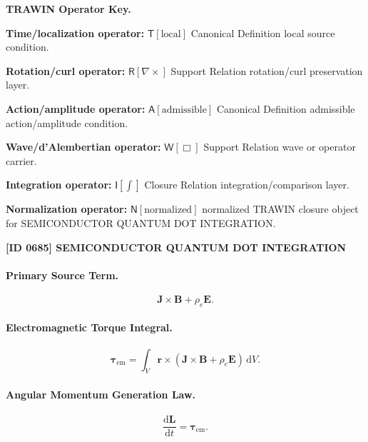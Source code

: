 \par\vspace{0.45\baselineskip}
\noindent\begin{minipage}[t]{\linewidth}
\begingroup
\small
\raggedright
\textbf{TRAWIN Operator Key.}\par
\noindent\textbf{Time/localization operator:} $\mathsf{T}\!\left[\mathrm{local}\right]$ Canonical Definition local source condition.\par
\noindent\textbf{Rotation/curl operator:} $\mathsf{R}\!\left[\nabla\times\right]$ Support Relation rotation/curl preservation layer.\par
\noindent\textbf{Action/amplitude operator:} $\mathsf{A}\!\left[\mathrm{admissible}\right]$ Canonical Definition admissible action/amplitude condition.\par
\noindent\textbf{Wave/d'Alembertian operator:} $\mathsf{W}\!\left[\Box\right]$ Support Relation wave or operator carrier.\par
\noindent\textbf{Integration operator:} $\mathsf{I}\!\left[\int\right]$ Closure Relation integration/comparison layer.\par
\noindent\textbf{Normalization operator:} $\mathsf{N}\!\left[\mathrm{normalized}\right]$ normalized TRAWIN closure object for SEMICONDUCTOR QUANTUM DOT INTEGRATION.\par
\endgroup
\end{minipage}

\clearpage
\noindent\textbf{[ID 0685] SEMICONDUCTOR QUANTUM DOT INTEGRATION}\par
\vspace{0.35em}
\paragraph{Primary Source Term.}
\begin{equation}
\mathbf{J}\times\mathbf{B}
+
\rho_e\mathbf{E}.
\end{equation}

\paragraph{Electromagnetic Torque Integral.}
\begin{equation}
\boldsymbol{\tau}_{\mathrm{em}}
=
\int_V
\mathbf{r}\times
\left(
\mathbf{J}\times\mathbf{B}
+
\rho_e\mathbf{E}
\right)
\,\mathrm{d}V .
\end{equation}

\paragraph{Angular Momentum Generation Law.}
\begin{equation}
\frac{\mathrm{d}\mathbf{L}}{\mathrm{d}t}
=
\boldsymbol{\tau}_{\mathrm{em}} .
\end{equation}

